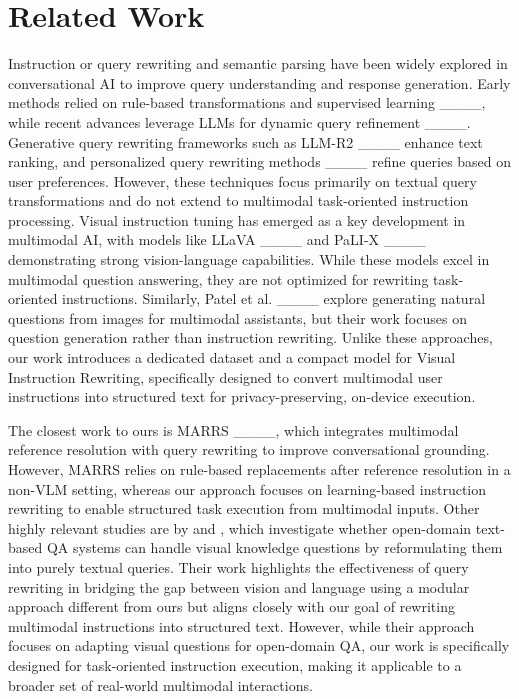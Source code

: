 \section{Related Work}
\label{sec:related_work}
Instruction or query rewriting and semantic parsing have been widely explored in conversational AI to improve query understanding and response generation. Early methods relied on rule-based transformations and supervised learning ____, while recent advances leverage LLMs for dynamic query refinement ____. Generative query rewriting frameworks such as LLM-R2 ____ enhance text ranking, and personalized query rewriting methods ____ refine queries based on user preferences. However, these techniques focus primarily on textual query transformations and do not extend to multimodal task-oriented instruction processing. Visual instruction tuning has emerged as a key development in multimodal AI, with models like LLaVA ____ and PaLI-X ____ demonstrating strong vision-language capabilities. While these models excel in multimodal question answering, they are not optimized for rewriting task-oriented instructions. Similarly, Patel et al. ____ explore generating natural questions from images for multimodal assistants, but their work focuses on question generation rather than instruction rewriting. Unlike these approaches, our work introduces a dedicated dataset and a compact model for Visual Instruction Rewriting, specifically designed to convert multimodal user instructions into structured text for privacy-preserving, on-device execution.  

The closest work to ours is MARRS ____, which integrates multimodal reference resolution with query rewriting to improve conversational grounding. However, MARRS relies on rule-based replacements after reference resolution in a non-VLM setting, whereas our approach focuses on learning-based instruction rewriting to enable structured task execution from multimodal inputs. Other highly relevant studies are by  and , which investigate whether open-domain text-based QA systems can handle visual knowledge questions by reformulating them into purely textual queries. Their work highlights the effectiveness of query rewriting in bridging the gap between vision and language using a modular approach different from ours but aligns closely with our goal of rewriting multimodal instructions into structured text. However, while their approach focuses on adapting visual questions for open-domain QA, our work is specifically designed for task-oriented instruction execution, making it applicable to a broader set of real-world multimodal interactions.